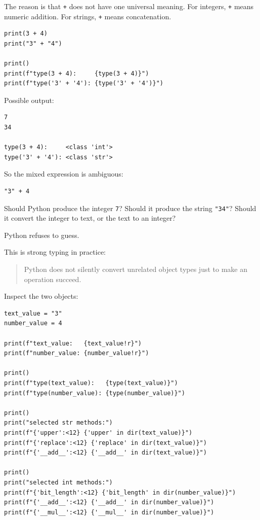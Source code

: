 The reason is that \texttt{+} does not have one universal meaning. For integers, \texttt{+} means numeric addition. For strings, \texttt{+} means concatenation.

\begin{verbatim}
print(3 + 4)
print("3" + "4")

print()
print(f"type(3 + 4):     {type(3 + 4)}")
print(f"type('3' + '4'): {type('3' + '4')}")
\end{verbatim}

Possible output:

\begin{verbatim}
7
34

type(3 + 4):     <class 'int'>
type('3' + '4'): <class 'str'>
\end{verbatim}

So the mixed expression is ambiguous:

\begin{verbatim}
"3" + 4
\end{verbatim}

Should Python produce the integer \texttt{7}? Should it produce the string \texttt{"34"}? Should it convert the integer to text, or the text to an integer?

Python refuses to guess.

This is strong typing in practice:

\begin{quote}
Python does not silently convert unrelated object types just to make an operation succeed.
\end{quote}

Inspect the two objects:

\begin{verbatim}
text_value = "3"
number_value = 4

print(f"text_value:   {text_value!r}")
print(f"number_value: {number_value!r}")

print()
print(f"type(text_value):   {type(text_value)}")
print(f"type(number_value): {type(number_value)}")

print()
print("selected str methods:")
print(f"{'upper':<12} {'upper' in dir(text_value)}")
print(f"{'replace':<12} {'replace' in dir(text_value)}")
print(f"{'__add__':<12} {'__add__' in dir(text_value)}")

print()
print("selected int methods:")
print(f"{'bit_length':<12} {'bit_length' in dir(number_value)}")
print(f"{'__add__':<12} {'__add__' in dir(number_value)}")
print(f"{'__mul__':<12} {'__mul__' in dir(number_value)}")
\end{verbatim}

